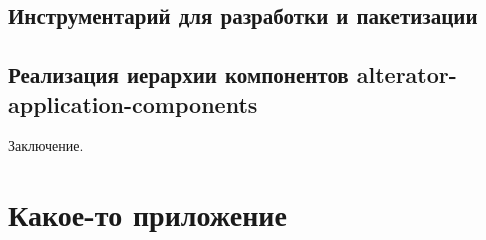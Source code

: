 \documentclass[bachelor, och, pract]{SCWorks}
\begin{document}
\subsection{Инструментарий для разработки и пакетизации}

\subsection{Реализация иерархии компонентов alterator-application-components}

\newpage

\conclusion
Заключение.

%

%



\appendix

\section{Какое-то приложение}
\end{document}
